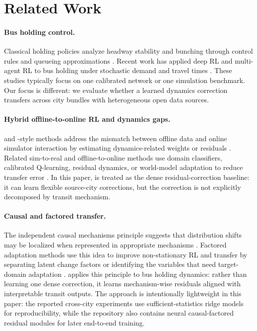 \section{Related Work}

\paragraph{Bus holding control.}
Classical holding policies analyze headway stability and bunching through control rules and queueing approximations \citep{daganzo2009headway,xuan2011dynamic}.
Recent work has applied deep RL and multi-agent RL to bus holding under stochastic demand and travel times \citep{alesiani2018reinforcement,wang2020real,liu2023deepholding,wang2023multiobjective}.
These studies typically focus on one calibrated network or one simulation benchmark.
Our focus is different: we evaluate whether a learned dynamics correction transfers across city bundles with heterogeneous open data sources.

\paragraph{Hybrid offline-to-online RL and dynamics gaps.}
\Htwo and \Htwo-style methods address the mismatch between offline data and online simulator interaction by estimating dynamics-related weights or residuals \citep{niu2022h2o,liu2024h2oplus}.
Related sim-to-real and offline-to-online methods use domain classifiers, calibrated Q-learning, residual dynamics, or world-model adaptation to reduce transfer error \citep{eysenbach2021off,nakamoto2023calql,lanier2025redraw}.
In this paper, \Htwo is treated as the dense residual-correction baseline: it can learn flexible source-city corrections, but the correction is not explicitly decomposed by transit mechanism.

\paragraph{Causal and factored transfer.}
The independent causal mechanisms principle suggests that distribution shifts may be localized when represented in appropriate mechanisms \citep{bengio2020meta}.
Factored adaptation methods use this idea to improve non-stationary RL and transfer by separating latent change factors or identifying the variables that need target-domain adaptation \citep{huang2022adarl,feng2022factored}.
\ours applies this principle to bus holding dynamics: rather than learning one dense correction, it learns mechanism-wise residuals aligned with interpretable transit outputs.
The approach is intentionally lightweight in this paper: the reported cross-city experiments use sufficient-statistics ridge models for reproducibility, while the repository also contains neural causal-factored residual modules for later end-to-end training.

